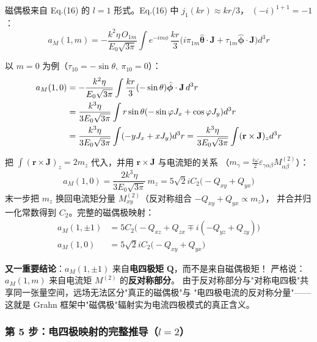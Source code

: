 磁偶极来自 Eq.(16) 的 $l=1$ 形式。Eq.(16) 中 $j_1(kr)\approx kr/3$，
$(-i)^{1+1}=-1$：
\begin{equation}
  a_M(1,m) = -\frac{k^2\eta\,O_{1m}}{E_0\sqrt{3\pi}}
  \int e^{-im\phi}\,\frac{kr}{3}\bigl(i\pi_{1m}\hat{\boldsymbol{\theta}}\cdot\mathbf{J}
    + \tau_{1m}\hat{\boldsymbol{\phi}}\cdot\mathbf{J}\bigr)d^3r
\end{equation}

以 $m=0$ 为例（$\tau_{10}=-\sin\theta,\ \pi_{10}=0$）：
\begin{align}
  a_M(1,0) &= -\frac{k^2\eta}{E_0\sqrt{3\pi}}\int\frac{kr}{3}(-\sin\theta)\hat{\boldsymbol{\phi}}\cdot\mathbf{J}\,d^3r \notag\\
  &= \frac{k^3\eta}{3E_0\sqrt{3\pi}}\int r\sin\theta(-\sin\varphi J_x + \cos\varphi J_y)d^3r \notag\\
  &= \frac{k^3\eta}{3E_0\sqrt{3\pi}}\int(-yJ_x + xJ_y)d^3r
    = \frac{k^3\eta}{3E_0\sqrt{3\pi}}\int(\mathbf{r}\times\mathbf{J})_z d^3r
\end{align}

把 $\int(\mathbf{r}\times\mathbf{J})_z=2m_z$ 代入，并用 $\mathbf{r}\times\mathbf{J}$ 与电流矩的关系
（$m_\gamma=\frac{i\omega}{2}\varepsilon_{\gamma\alpha\beta}M^{(2)}_{\alpha\beta}$）：
\begin{equation}
  a_M(1,0) = \frac{2k^3\eta}{3E_0\sqrt{3\pi}}\,m_z
  = 5\sqrt{2}iC_2\bigl(-Q_{xy}+Q_{yx}\bigr)
\end{equation}
末一步把 $m_z$ 换回电流矩分量 $M^{(2)}_{xy}$（反对称组合 $-Q_{xy}+Q_{yx}\propto m_z$），
并合并归一化常数得到 $C_2$。完整的磁偶极映射：
\begin{align}
  a_M(1,\pm1) &= 5C_2\bigl(-Q_{xz}+Q_{zx} \mp i(-Q_{yz}+Q_{zy})\bigr) \\
  a_M(1,0) &= 5\sqrt{2}iC_2\bigl(-Q_{xy}+Q_{yx}\bigr)
\end{align}

\begin{nontrivial}
\textbf{又一重要结论}：$a_M(1,\pm1)$ 来自\textbf{电四极矩} $\mathbf{Q}$，而不是来自磁偶极矩！
严格说：$a_M(1,m)$ 来自电流矩 $M^{(2)}$ 的\textbf{反对称部分}。
由于反对称部分与"对称电四极"共享同一张量空间，远场无法区分"真正的磁偶极"与
"电四极电流的反对称分量"——这就是 Grahn 框架中"磁偶极"辐射实为电流四极模式的真正含义。
\end{nontrivial}

\subsubsection{第 5 步：电四极映射的完整推导（$l=2$）}

